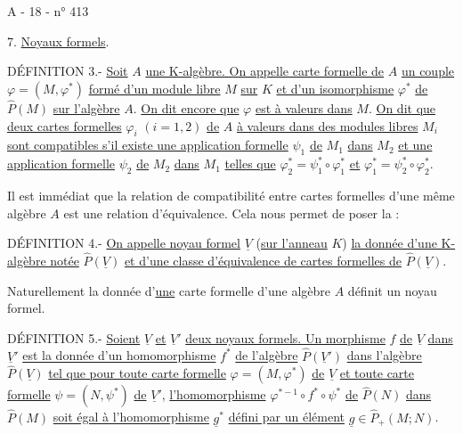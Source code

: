 

A - 18 - \hfill n° 413

7. \uline{Noyaux formels}.

DÉFINITION 3.- \uline{Soit} $A$ \uline{une K-algèbre. On appelle carte formelle de} $A$ \uline{un couple} $\varphi=(M,\varphi^*)$ \uline{formé d'un module libre} $M$ \uline{sur} $K$ \uline{et d'un isomorphisme} $\varphi^*$ \uline{de} $\widehat P(M)$ \uline{sur l'algèbre} $A$. \uline{On dit encore que} $\varphi$ \uline{est à valeurs dans} $M$. \uline{On dit que deux cartes formelles} $\varphi_i$ $(i=1,2)$ \uline{de} $A$ \uline{à valeurs dans des modules libres} $M_i$ \uline{sont compatibles s'il existe une application formelle} $\psi_1$ \uline{de} $M_1$ \uline{dans} $M_2$ \uline{et une application formelle} $\psi_2$ \uline{de} $M_2$ \uline{dans} $M_1$ \uline{telles que} $\varphi_2^*=\psi_1^*\circ\varphi_1^*$ \uline{et} $\varphi_1^*=\psi_2^*\circ\varphi_2^*$.

Il est immédiat que la relation de compatibilité entre cartes formelles d'une même algèbre $A$ est une relation d'équivalence. Cela nous permet de poser la :

DÉFINITION 4.- \uline{On appelle noyau formel} $\underline V$ (\uline{sur l'anneau} $K$) \uline{la donnée d'une K-algèbre notée} $\widehat P(\underline V)$ \uline{et d'une classe d'équivalence de cartes formelles de} $\widehat P(\underline V)$.

Naturellement la donnée d'\uline{une} carte formelle d'une algèbre $A$ définit un noyau formel.

DÉFINITION 5.- \uline{Soient} $\underline V$ \uline{et} $\underline V'$ \uline{deux noyaux formels. Un morphisme} $f$ \uline{de} $\underline V$ \uline{dans} $\underline V'$ \uline{est la donnée d'un homomorphisme} $f^*$ \uline{de l'algèbre} $\widehat P(\underline V')$ \uline{dans l'algèbre} $\widehat P(\underline V)$ \uline{tel que pour toute carte formelle} $\varphi=(M,\varphi^*)$ \uline{de} $\underline V$ \uline{et toute carte formelle} $\psi=(N,\psi^*)$ \uline{de} $\underline V'$, \uline{l'homomorphisme} $\varphi^{*-1}\circ f^*\circ\psi^*$ \uline{de} $\widehat P(N)$ \uline{dans} $\widehat P(M)$ \uline{soit égal à l'homomorphisme} $\underline g^*$ \uline{défini par un élément} $\underline g\in\widehat P_+(M;N)$.

